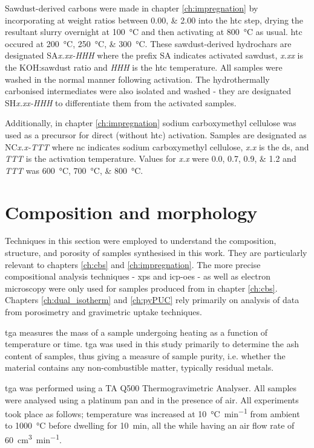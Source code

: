 Sawdust-derived carbons were made in chapter \ref{ch:impregnation} by incorporating  at weight ratios between \numlist{0.00;2.00} into the \gls{htc} step, drying the resultant slurry overnight at \qty{100}{\degreeCelsius} and then activating at \qty{800}{\degreeCelsius} as usual. \Gls{htc} occured at \qtylist[list-units=single]{200;250;300}{\degreeCelsius}. These sawdust-derived \glspl{hydrochar} are designated SA\textit{x.xx-HHH} where the prefix SA indicates activated sawdust, \textit{x.xx} is the KOH:sawdust ratio and \textit{HHH} is the \gls{htc} temperature. All samples were washed in the normal manner following activation. The hydrothermally carbonised intermediates were also isolated and washed - they are designated  SH\textit{x.xx-HHH} to differentiate them from the activated samples.

Additionally, in chapter \ref{ch:impregnation} sodium carboxymethyl cellulose was used as a precursor for direct (without \gls{htc}) activation.  Samples are designated as NC\textit{x.x-TTT} where \acrshort{nc} indicates sodium carboxymethyl cellulose, \textit{x.x} is the \acrshort{ds}, and \textit{TTT} is the activation temperature. Values for \textit{x.x} were \numlist{0.0;0.7;0.9;1.2} and \textit{TTT} was \qtylist[list-units=single]{600;700;800}{\degreeCelsius}.

\section{Composition and morphology}
Techniques in this section were employed to understand the composition, structure, and porosity of samples synthesised in this work. They are particularly relevant to chapters \ref{ch:cbs} and \ref{ch:impregnation}. The more precise compositional analysis techniques - \acrfull{xps} and \acrfull{icp-oes} - as well as electron microscopy were only used for samples produced from  in chapter \ref{ch:cbs}. Chapters \ref{ch:dual_isotherm} and \ref{ch:pyPUC} rely primarily on analysis of data from porosimetry and gravimetric uptake techniques.

\acrfull{tga} measures the mass of a sample undergoing heating as a function of temperature or time.\citep{coats1963thermogravimetric} \acrshort{tga} was used in this study primarily to determine the \gls{ash content} of samples, thus giving a measure of sample purity,\citep{mcnaught1997compendium} i.e. whether the material contains any non-combustible matter, typically residual metals.

\acrshort{tga} was performed using a TA Q500 Thermogravimetric Analyser. All samples were analysed using a platinum pan and in the presence of air. All experiments took place as follows; temperature was increased at \qty{10}{\degreeCelsius\per\minute} from ambient to \qty{1000}{\degreeCelsius} before dwelling for \qty{10}{\minute}, all the while having an air flow rate of \qty{60}{\cm\cubed\per\minute}.

